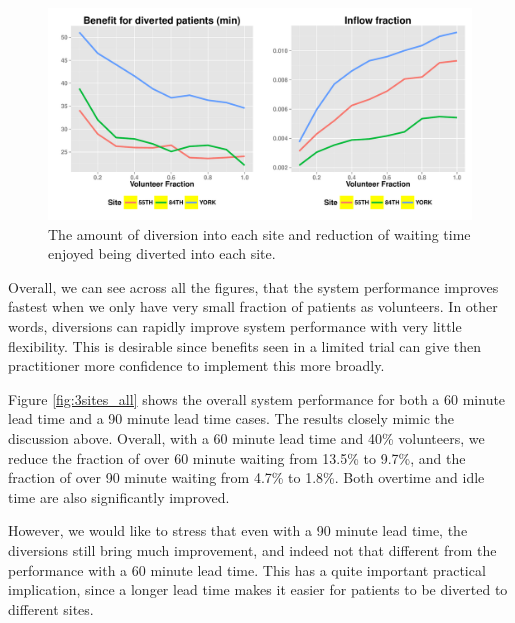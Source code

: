 \begin{figure}[htp]
\centering
\includegraphics[width=.95\textwidth]{chap3/numeric/pic/3sites_gain_flow}
\caption{The amount of diversion into each site and reduction of waiting time
enjoyed being diverted into each site.}
\label{fig:3sites_gain_flow}
\end{figure}

Overall, we can see across all the figures, that the system performance
improves fastest when we only have very small fraction of patients as
volunteers. In other words, diversions can rapidly improve system
performance with very little flexibility. This is desirable since
benefits seen in a limited trial can give then practitioner more confidence
to implement this more broadly.

Figure \ref{fig:3sites_all} shows the overall system performance for both a 60 minute
lead time and a 90 minute lead time cases. The results closely mimic the
discussion above. Overall, with a 60 minute lead time and 40\% volunteers,
we reduce the fraction of over 60 minute waiting from 13.5\% to 9.7\%, and the fraction of
over 90 minute waiting from 4.7\% to 1.8\%. Both overtime and idle time
are also significantly improved.

However, we would like to stress that even with a 90 minute lead time, the diversions
still bring much improvement, and indeed not that different from
the performance with a 60 minute lead time. This has a quite important practical
implication, since a longer lead time makes it easier for patients to be
diverted to different sites.

